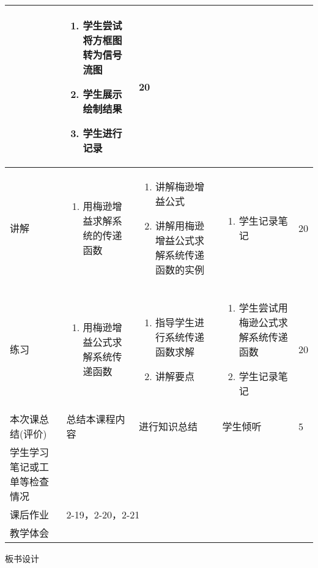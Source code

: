 {\begin{landscape}
\begin{longtable}{|m{10mm}|m{50mm}|m{50mm}|m{50mm}|m{15mm}|}
\begin{enumerate}
\end{enumerate} &\begin{enumerate}
\item 学生尝试将方框图转为信号流图
\item 学生展示绘制结果
\item 学生进行记录
\end{enumerate} &20 \\\hline
讲解&\begin{enumerate}
\item 用梅逊增益求解系统的传递函数
\end{enumerate}
 &\begin{enumerate}
\item 讲解梅逊增益公式
\item 讲解用梅逊增益公式求解系统传递函数的实例
\end{enumerate} &\begin{enumerate}
\item 学生记录笔记
\end{enumerate} &20 \\\hline
练习&
\begin{enumerate}
\item 用梅逊增益公式求解系统传递函数
\end{enumerate}
 &\begin{enumerate}
\item 指导学生进行系统传递函数求解
\item 讲解要点
\end{enumerate} &\begin{enumerate}
\item 学生尝试用梅逊公式求解系统传递函数
\item 学生记录笔记
\end{enumerate} &20 \\\hline
\centering 本次课总结(评价)&总结本课程内容 &进行知识总结 &学生倾听 &5 \\\hline
\centering 学生学习笔记或工单等检查情况&\multicolumn{4}{m{165mm}|}{\quad}\\\hline
\centering 课后作业&\multicolumn{4}{m{165mm}|}{2-19，2-20，2-21}\\\hline
\centering 教学体会&\multicolumn{4}{m{165mm}|}{\quad}\\
\end{longtable}

\end{landscape}
\clearpage
\begin{center}
{\huge 板书设计}
\end{center}
}
